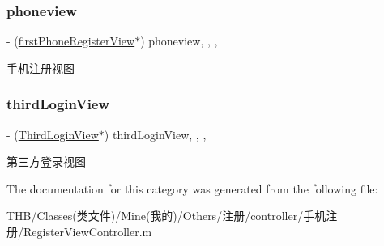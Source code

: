 \subsubsection{\texorpdfstring{phoneview}{phoneview}}
{\footnotesize\ttfamily -\/ (\mbox{\hyperlink{interfacefirst_phone_register_view}{first\+Phone\+Register\+View}}$\ast$) phoneview\hspace{0.3cm}{\ttfamily [read]}, {\ttfamily [write]}, {\ttfamily [nonatomic]}, {\ttfamily [strong]}}

手机注册视图 \mbox{\label{category_register_view_controller_07_08_a09214d1f44e889ecb603cb2dacd9beb1}} 
\subsubsection{\texorpdfstring{third\+Login\+View}{thirdLoginView}}
{\footnotesize\ttfamily -\/ (\mbox{\hyperlink{interface_third_login_view}{Third\+Login\+View}}$\ast$) third\+Login\+View\hspace{0.3cm}{\ttfamily [read]}, {\ttfamily [write]}, {\ttfamily [nonatomic]}, {\ttfamily [strong]}}

第三方登录视图 

The documentation for this category was generated from the following file\+:\begin{DoxyCompactItemize}
\item 
T\+H\+B/\+Classes(类文件)/\+Mine(我的)/\+Others/注册/controller/手机注册/Register\+View\+Controller.\+m\end{DoxyCompactItemize}
